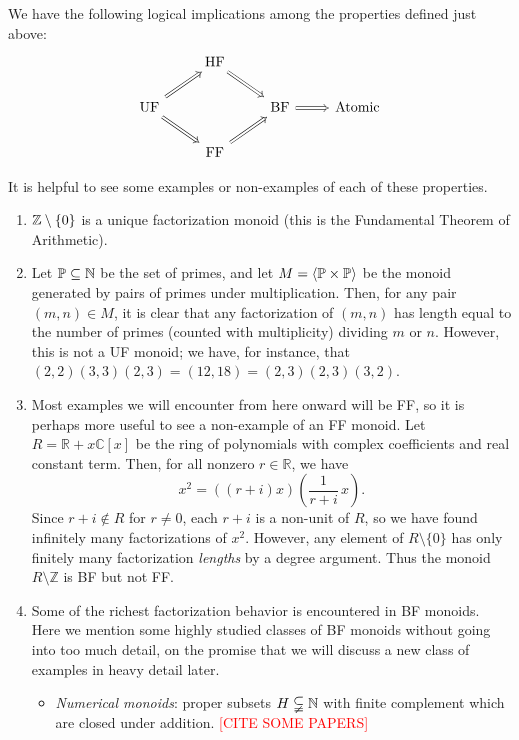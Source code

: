 \begin{prop}
We have the following logical implications among the properties defined just above:
\[\begin{tikzcd}[arrows = Rightarrow]
 & \text{HF} \arrow{dr}&  &  \\
\text{UF} \arrow{ur}\arrow{dr}  &  & \text{BF} \arrow{r}& \text{Atomic} \\
 & \text{FF} \arrow{ur} &  & 
\end{tikzcd}\]
\end{prop}



\begin{eg}
It is helpful to see some examples or non-examples of each of these properties.
\begin{enumerate}[label={\rm (\roman{*})}]
\item $\mathbb{Z}\setminus \{0\}$ is a unique factorization monoid (this is the Fundamental Theorem of Arithmetic).
\item Let $\mathbb{P} \subseteq \mathbb{N}$ be the set of primes, and let $M = \langle \mathbb{P}\times \mathbb{P} \rangle$ be the monoid generated by pairs of primes under multiplication.  
Then, for any pair $(m,n)\in M$, it is clear that any factorization of $(m,n)$ has length equal to the number of primes (counted with multiplicity) dividing $m$ or $n$.
However, this is not a UF monoid; we have, for instance, that $(2,2)(3,3)(2,3) = (12,18) = (2,3)(2,3)(3,2)$.
\item Most examples we will encounter from here onward will be FF, so it is perhaps more useful to see a non-example of an FF monoid.
Let $R = \mathbb{R} + x \mathbb{C}[x]$ be the ring of polynomials with complex coefficients and real constant term.
Then, for all nonzero $r\in \mathbb{R}$, we have
\[ x^2 = ((r+i)x)\left(\frac{1}{r+i}\,x\right). \]
Since $r+i\notin R$ for $r\neq0$, each $r+i$ is a non-unit of $R$, so we have found infinitely many factorizations of $x^2$.
However, any element of $R\setminus \{0\}$ has only finitely many factorization \textit{lengths} by a degree argument.
Thus the monoid $R\setminus \mathbb{Z}$ is BF but not FF.
\item Some of the richest factorization behavior is encountered in BF monoids.  
Here we mention some highly studied classes of BF monoids without going into too much detail, on the promise that we will discuss a new class of examples in heavy detail later.
\begin{itemize}
\item \textit{Numerical monoids}: proper subsets $H \subsetneqq \mathbb{N}$ with finite complement which are closed under addition. \textcolor{red}{[CITE SOME PAPERS]}

\end{itemize}
\end{enumerate}
\end{eg}
